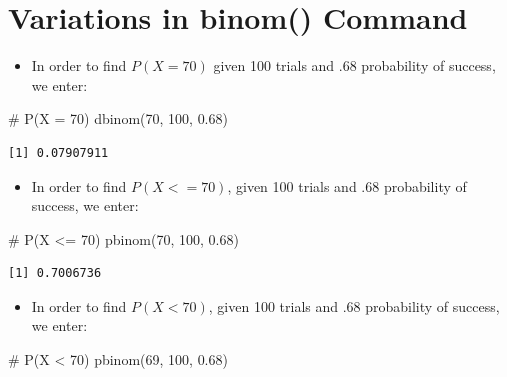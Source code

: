 \documentclass[
  letterpaper,
  DIV=11,
  numbers=noendperiod]{scrreprt}
\newenvironment{Shaded}{\begin{snugshade}}{\end{snugshade}}
\newcommand{\CommentTok}[1]{\textcolor[rgb]{0.37,0.37,0.37}{#1}}
\newcommand{\DecValTok}[1]{\textcolor[rgb]{0.68,0.00,0.00}{#1}}
\newcommand{\FloatTok}[1]{\textcolor[rgb]{0.68,0.00,0.00}{#1}}
\newcommand{\FunctionTok}[1]{\textcolor[rgb]{0.28,0.35,0.67}{#1}}
\newcommand{\NormalTok}[1]{\textcolor[rgb]{0.00,0.23,0.31}{#1}}
\providecommand{\tightlist}{%
  \setlength{\itemsep}{0pt}\setlength{\parskip}{0pt}}\usepackage{longtable,booktabs,array}
\begin{document}
\section{Variations in binom()
Command}\label{variations-in-binom-command}

\begin{itemize}
\tightlist
\item
  In order to find \(P(X = 70)\) given 100 trials and .68 probability of
  success, we enter:
\end{itemize}

\begin{Shaded}
\begin{Highlighting}[]
\CommentTok{\# P(X = 70)}
\FunctionTok{dbinom}\NormalTok{(}\DecValTok{70}\NormalTok{, }\DecValTok{100}\NormalTok{, }\FloatTok{0.68}\NormalTok{)}
\end{Highlighting}
\end{Shaded}

\begin{verbatim}
[1] 0.07907911
\end{verbatim}

\begin{itemize}
\tightlist
\item
  In order to find \(P(X <= 70)\), given 100 trials and .68 probability
  of success, we enter:
\end{itemize}

\begin{Shaded}
\begin{Highlighting}[]
\CommentTok{\# P(X \textless{}= 70)}
\FunctionTok{pbinom}\NormalTok{(}\DecValTok{70}\NormalTok{, }\DecValTok{100}\NormalTok{, }\FloatTok{0.68}\NormalTok{)}
\end{Highlighting}
\end{Shaded}

\begin{verbatim}
[1] 0.7006736
\end{verbatim}

\begin{itemize}
\tightlist
\item
  In order to find \(P(X < 70)\), given 100 trials and .68 probability
  of success, we enter:
\end{itemize}

\begin{Shaded}
\begin{Highlighting}[]
\CommentTok{\# P(X \textless{} 70)}
\FunctionTok{pbinom}\NormalTok{(}\DecValTok{69}\NormalTok{, }\DecValTok{100}\NormalTok{, }\FloatTok{0.68}\NormalTok{)}
\end{Highlighting}
\end{Shaded}
\end{document}
